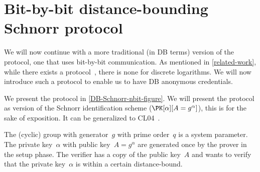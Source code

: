 \section{Bit-by-bit distance-bounding Schnorr protocol}%
\label{DB-Schnorr-nbit}

We will now continue with a more traditional (in \ac{DB} terms) version of the 
protocol, one that uses bit-by-bit communication.
As mentioned in \cref{related-work}, while there exists a  
protocol~\cite{ProProx}, there is none for discrete logarithms. We will now introduce such a protocol to enable us to have \ac{DB} anonymous credentials.


We present the protocol in \cref{DB-Schnorr-nbit-figure}.
We will present the protocol as  version of the Schnorr identification 
scheme (\(\PK[\alpha][A = g^\alpha]\)), this is for the sake of exposition.
It can be generalized to \eg CL04~\cite{CLsignatures}.

The (cyclic) group with generator~\(g\) with prime order~\(q\) is a system 
parameter.
The private key~\(\alpha\) with public key~\(A = g^\alpha\) are generated once 
by the prover in the setup phase.
The verifier has a copy of the public key~\(A\) and wants to verify that the 
private key~\(\alpha\) is within a certain distance-bound.

